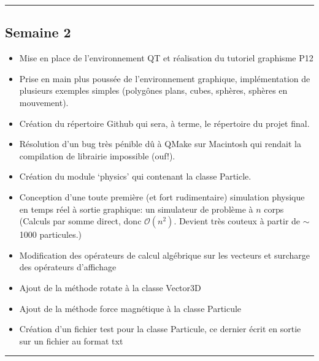 \documentclass[12pt, letterpaper, twoside]{article}
\begin{document}
\rule{\textwidth}{0.4pt}

\subsection{Semaine 2}
\begin{itemize}
\item Mise en place de l'environnement QT et réalisation du tutoriel graphisme P12 

\item Prise en main plus poussée de l'environnement graphique, implémentation de plusieurs exemples simples (polygônes plans, cubes, sphères, sphères en mouvement).

\item Création du répertoire Github qui sera, à terme, le répertoire du projet final.

\item Résolution d'un bug très pénible dû à QMake sur Macintosh qui rendait la compilation de librairie impossible (ouf!).

\item Création du module `physics' qui contenant la classe Particle.

\item Conception d'une toute première (et fort rudimentaire) simulation physique en temps réel à sortie graphique: un simulateur de problème à $n$ corps (Calculs par somme direct, donc $\mathcal{O}(n^2)$. Devient très couteux à partir de $\sim$1000 particules.)

\item Modification des opérateurs de calcul algébrique sur les vecteurs et surcharge des opérateurs d'affichage

\item Ajout de la méthode rotate à la classe Vector3D
\item Ajout de la méthode force magnétique à la classe Particule
\item Création d'un fichier test pour la classe Particule, ce dernier écrit en sortie sur un fichier au format txt
\end{itemize}

\rule{\textwidth}{0.4pt}
\end{document}
